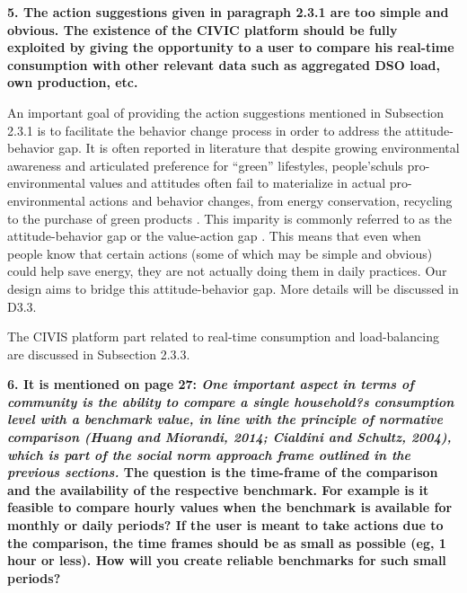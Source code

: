 \noindent\textbf{5. The action suggestions given in paragraph 2.3.1 are too simple and obvious. The existence of the CIVIC platform should be fully exploited by giving the opportunity to a user to compare his real-time consumption with other relevant data such as aggregated DSO load, own production, etc.}

\vspace{3mm}

An important goal of providing the action suggestions mentioned in Subsection 2.3.1 is to facilitate the behavior change process in order to address the attitude-behavior gap. It is often reported in literature that despite growing environmental awareness and articulated preference for ``green'' lifestyles, people'schuls pro-environmental values and attitudes often fail to materialize in actual pro-environmental actions and behavior changes, from energy conservation, recycling to the purchase of green products \citep{Schultz2002,Abrahamse2005,Claudy2013}. This imparity is commonly referred to as the attitude-behavior gap or the value-action gap \citep{Blake1999,Kollmuss2002,Claudy2013}. This means that even when people know that certain actions (some of which may be simple and obvious) could help save energy, they are not actually doing them in daily practices. Our design aims to bridge this attitude-behavior gap. More details will be discussed in D3.3.

The CIVIS platform part related to real-time consumption and load-balancing are discussed in Subsection 2.3.3. 

\vspace{3mm}

\noindent\textbf{6. It is mentioned on page 27: \textit{One important aspect in terms of community is the ability to compare a single household?s consumption level with a benchmark value, in line with the principle of normative comparison (Huang and Miorandi, 2014; Cialdini and Schultz, 2004), which is part of the social norm approach frame outlined in the previous sections.} The question is the time-frame of the comparison and the availability of the respective benchmark. For example is it feasible to compare hourly values when the benchmark is available for monthly or daily periods? If the user is meant to take actions due to the comparison, the time frames should be as small as possible (eg, 1 hour or less). How will you create reliable benchmarks for such small periods?}

\vspace{3mm}

